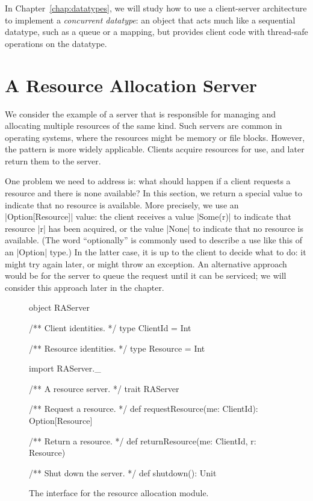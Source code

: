 In Chapter~\ref{chap:datatypes}, we will study how to use a client-server
architecture to implement a \emph{concurrent datatype}: an object that acts
much like a sequential datatype, such as a queue or a mapping, but provides
client code with thread-safe operations on the datatype. 


\section{A Resource Allocation Server}

We consider the example of a server that is responsible for managing and
allocating multiple resources of the same kind.  Such servers are common in
operating systems, where the resources might be memory or file blocks.
However, the pattern is more widely applicable.  Clients acquire resources for
use, and later return them to the server.

One problem we need to address is: what should happen if a client requests a
resource and there is none available?  In this section, we return a special
value to indicate that no resource is available.  More precisely, we use an
|Option[Resource]| value: the client receives a value |Some(r)| to indicate
that resource |r| has been acquired, or the value |None| to indicate that no
resource is available.  (The word ``optionally'' is commonly used to describe a
use like this of an |Option| type.)
%
In the latter case, it is up to the client to decide what to do: it might try
again later, or might throw an exception.  
%
An alternative approach would be for the server to queue the request until it
can be serviced; we will consider this approach later in the chapter.


\begin{figure}
\begin{scala}
object RAServer{
  /** Client identities. */
  type ClientId = Int

  /** Resource identities. */
  type Resource = Int
}

import RAServer._

/** A resource server. */
trait RAServer{
  /** Request a resource. */
  def requestResource(me: ClientId): Option[Resource]

  /** Return a resource. */
  def returnResource(me: ClientId, r: Resource) 

  /** Shut down the server. */
  def shutdown(): Unit
} 
\end{scala}
\caption{The interface for the resource allocation module.}
\label{fig:RAServer}
\end{figure}

